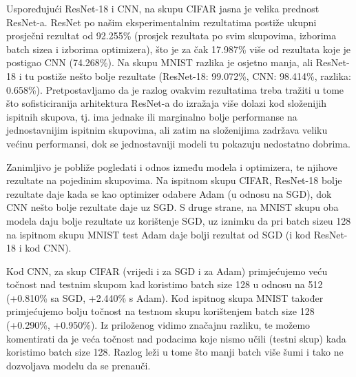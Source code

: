 \bigskip

Uspoređujući ResNet-18 i CNN, na skupu CIFAR jasna je velika prednost ResNet-a. ResNet po našim eksperimentalnim rezultatima postiže ukupni prosječni rezultat od 92.255\% (prosjek rezultata po svim skupovima, izborima batch sizea i izborima optimizera), što je za čak 17.987\% više od rezultata koje je postigao CNN (74.268\%). Na skupu MNIST razlika je osjetno manja, ali ResNet-18 i tu postiže nešto bolje rezultate (ResNet-18: 99.072\%, CNN: 98.414\%, razlika: 0.658\%). Pretpostavljamo da je razlog ovakvim rezultatima treba tražiti u tome što sofisticiranija arhitektura ResNet-a do izražaja više dolazi kod složenijih ispitnih skupova, tj. ima jednake ili marginalno bolje performanse na jednostavnijim ispitnim skupovima, ali zatim na složenijima zadržava veliku većinu performansi, dok se jednostavniji modeli tu pokazuju nedostatno dobrima.

\bigskip

Zanimljivo je pobliže pogledati i odnos između modela i optimizera, te njihove rezultate na pojedinim skupovima. Na ispitnom skupu CIFAR, ResNet-18 bolje rezultate daje kada se kao optimizer odabere Adam (u odnosu na SGD), dok CNN nešto bolje rezultate daje uz SGD. S druge strane, na MNIST skupu oba modela daju bolje rezultate uz korištenje SGD, uz iznimku da pri batch sizeu 128 na ispitnom skupu MNIST test Adam daje bolji rezultat od SGD (i kod ResNet-18 i kod CNN). 

\bigskip

Kod CNN, za skup CIFAR (vrijedi i za SGD i za Adam) primjećujemo veću točnost nad testnim skupom kad koristimo batch size 128 u odnosu na 512 (+0.810\% sa SGD, +2.440\% s Adam). Kod ispitnog skupa MNIST također primjećujemo bolju točnost na testnom skupu korištenjem batch size 128 (+0.290\%, +0.950\%). Iz priloženog vidimo značajnu razliku, te možemo komentirati da je veća točnost nad podacima koje nismo učili (testni skup) kada koristimo batch size 128. Razlog leži u tome što manji batch više šumi i tako ne dozvoljava modelu da se prenauči.